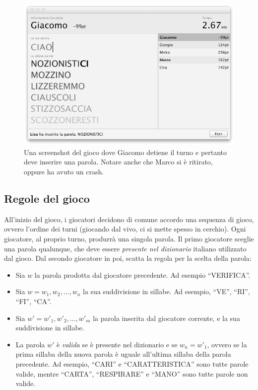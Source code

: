 \documentclass[10.5pt]{article}
\begin{document}
\begin{figure}
	\begin{center}
		\includegraphics[scale=0.5]{imgs/screenshot.png}
		\caption{Una screenshot del gioco dove Giacomo detiene il turno e pertanto deve inserire una parola. Notare anche che Marco si è ritirato, oppure ha avuto un crash.}
	\end{center}
\end{figure}


\subsection{Regole del gioco}
All'inizio del gioco, i giocatori decidono di comune accordo una sequenza di gioco, ovvero l'ordine dei turni (giocando dal vivo, ci si mette spesso in cerchio). Ogni giocatore, al proprio turno, produrrà una singola parola. Il primo giocatore sceglie una parola qualunque, che deve essere \emph{presente nel dizionario} italiano utilizzato dal gioco. Dal secondo giocatore in poi, scatta la regola per la scelta della parola:

\begin{itemize}
\item Sia $w$ la parola prodotta dal giocatore precedente. Ad esempio ``VERIFICA''.
\item Sia $w=w_1, w_2, \dots, w_n$ la sua suddivisione in sillabe. Ad esempio, ``VE'', ``RI'', ``FI'', ``CA''.
\item Sia $w'=w'_1, w'_2, \dots, w'_m$ la parola inserita dal giocatore corrente, e la sua suddivisione in sillabe.
\item La parola $w'$ è \emph{valida} se è presente nel dizionario e se $w_n = w'_1$, ovvero se la prima sillaba della nuova parola è uguale all'ultima sillaba della parola precedente. Ad esempio, ``CARI'' e ``CARATTERISTICA'' sono tutte parole valide, mentre ``CARTA'', ``RESPIRARE'' e ``MANO'' sono tutte parole non valide.
\end{itemize}
\end{document}

